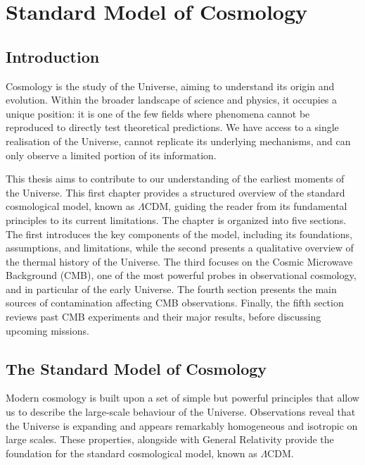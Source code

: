\documentclass[../../thesis.tex]{subfiles}
\begin{document}
\chapter{Standard Model of Cosmology} \label{chap:cosmo}

\ifSubfilesClassLoaded{
    \tableofcontents
}{
    \minitoc
}

\section*{Introduction}

Cosmology is the study of the Universe, aiming to understand its origin and evolution. Within the broader landscape of science and physics, it occupies a unique position: it is one of the few fields where phenomena cannot be reproduced to directly test theoretical predictions. We have access to a single realisation of the Universe, cannot replicate its underlying mechanisms, and can only observe a limited portion of its information.

This thesis aims to contribute to our understanding of the earliest moments of the Universe. This first chapter provides a structured overview of the standard cosmological model, known as $\Lambda$CDM, guiding the reader from its fundamental principles to its current limitations. The chapter is organized into five sections. The first introduces the key components of the model, including its foundations, assumptions, and limitations, while the second presents a qualitative overview of the thermal history of the Universe. The third focuses on the Cosmic Microwave Background (CMB), one of the most powerful probes in observational cosmology, and in particular of the early Universe. The fourth section presents the main sources of contamination affecting CMB observations. Finally, the fifth section reviews past CMB experiments and their major results, before discussing upcoming missions.

\section{The Standard Model of Cosmology}

Modern cosmology is built upon a set of simple but powerful principles that allow us to describe the large-scale behaviour of the Universe. Observations reveal that the Universe is expanding and appears remarkably homogeneous and isotropic on large scales. These properties, alongside with General Relativity provide the foundation for the standard cosmological model, known as $\Lambda$CDM.
\end{document}
